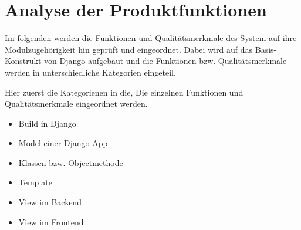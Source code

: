 \chapter{Analyse der Produktfunktionen}

%
%
Im folgenden werden die Funktionen und Qualitätsmerkmale des System auf ihre
Modulzugehörigkeit hin geprüft und eingeordnet. Dabei wird auf das
Basis-Konstrukt von Django aufgebaut und die Funktionen bzw. Qualitätsmerkmale
werden in unterschiedliche Kategorien eingeteil.

Hier zuerst die Kategorienen in die, Die einzelnen Funktionen und
Qualitätsmerkmale eingeordnet werden.
\begin{itemize}
	\item Build in Django
	\item Model einer Django-App
	\item Klassen bzw. Objectmethode
	\item Template
	\item View im Backend
	\item View im Frontend
\end{itemize}

